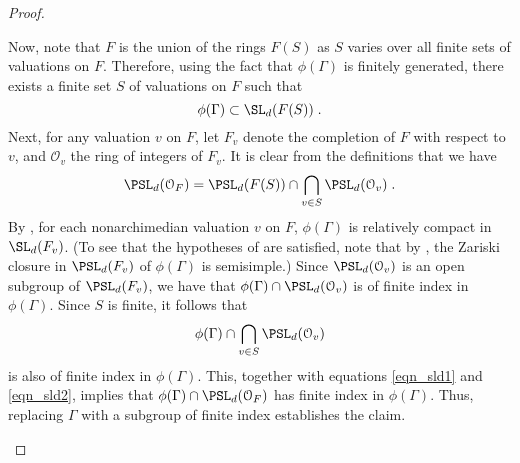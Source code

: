 \documentclass[oneside,leqno,11pt]{amsart}
\begin{document}
\begin{proof}
\begin{claimproof}
    Now, note that $F$ is the union of the rings $F(S)$ as $S$ varies
    over all finite sets of valuations on $F$.  Therefore, using the
    fact that $\phi(\Gamma)$ is finitely generated, there exists a
    finite set $S$ of valuations on $F$ such that
    \begin{equation}
      \label{eqn_sld1}
      \phi(\Gamma)\subset\SL_d(F(S))\;.
    \end{equation}
    Next, for any valuation $v$ on $F$, let $F_v$ denote the completion
    of $F$ with respect to $v$, and $\mathcal O_v$ the ring of
    integers of $F_v$.  It is clear from the definitions that we have
    \begin{equation}
      \label{eqn_sld2}
      \PSL_d(\mathcal O_F)
      =\PSL_d(F(S))\cap\bigcap_{v\in S}\PSL_d(\mathcal O_v)\;.
    \end{equation}
    By \cite[Theorem VII.5.16]{margulis}, for each nonarchimedian
    valuation $v$ on $F$, $\phi(\Gamma)$ is relatively compact in
    $\SL_d(F_v)$.  (To see that the hypotheses of \cite[Theorem
    VII.5.16]{margulis} are satisfied, note that by \cite[Theorem
    VIII.3.10]{margulis}, the Zariski closure in $\PSL_d(F_v)$ of
    $\phi(\Gamma)$ is semisimple.)  Since $\PSL_d(\mathcal O_v)$ is an
    open subgroup of $\PSL_d(F_v)$, we have that
    $\phi(\Gamma)\cap\PSL_d(\mathcal O_v)$ is of finite index in
    $\phi(\Gamma)$.  Since $S$ is finite, it follows that
    \[\phi(\Gamma)\cap\bigcap_{v\in S}\PSL_d(\mathcal O_v)
    \]
    is also of finite index in $\phi(\Gamma)$.  This, together with
    equations \eqref{eqn_sld1} and \eqref{eqn_sld2}, implies that
    $\phi(\Gamma)\cap\PSL_d(\mathcal O_F)$ has finite index in
    $\phi(\Gamma)$.  Thus, replacing $\Gamma$ with a subgroup of
    finite index establishes the claim.
  \end{claimproof}


\end{proof}
\end{document}
